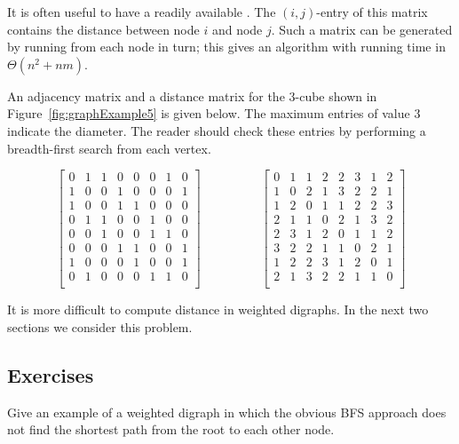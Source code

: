 It is often useful to have a readily available .
The $(i, j)$-entry of this matrix contains the distance between node $i$
and node $j$. Such a matrix can be generated by running 
from each node in turn; this gives an algorithm with running time in
$\Theta(n^2+nm)$.


\begin{Example}
An adjacency matrix and a distance matrix for the 3-cube shown in
Figure~\ref{fig:graphExample5} is given below.  The maximum entries of
value $3$ indicate the diameter. The reader should check these entries
by performing a breadth-first search from each vertex.

\[
\left[
\begin{array}{cccccccc}
0& 1& 1& 0& 0& 0& 1& 0\\
1& 0& 0& 1& 0& 0& 0& 1 \\
1& 0& 0& 1& 1& 0& 0& 0\\
0& 1& 1& 0& 0& 1& 0& 0 \\
0& 0& 1& 0& 0& 1& 1& 0 \\
0& 0& 0& 1& 1& 0& 0& 1 \\
1& 0& 0& 0& 1& 0& 0& 1 \\
0& 1& 0& 0& 0& 1& 1& 0 \\
\end{array}
\right]
\hspace{2cm}
\left[
\begin{array}{cccccccc}
0& 1& 1& 2& 2& 3& 1& 2\\
1& 0& 2& 1& 3& 2& 2& 1\\
1& 2& 0& 1& 1& 2& 2& 3\\
2& 1& 1& 0& 2& 1& 3& 2\\
2& 3& 1& 2& 0& 1& 1& 2\\
3& 2& 2& 1& 1& 0& 2& 1\\
1& 2& 2& 3& 1& 2& 0& 1\\
2& 1& 3& 2& 2& 1& 1& 0\\
\end{array}
\right]
\]

\end{Example}

It is more difficult to compute distance in weighted digraphs. In the
next two sections we consider this problem.

\subsection*{Exercises}

\begin{Exercise}
\label{ex:BFSfails}
Give an example of a weighted digraph in which the obvious BFS approach
does not find the shortest path from the root to each other node.
\end{Exercise}

